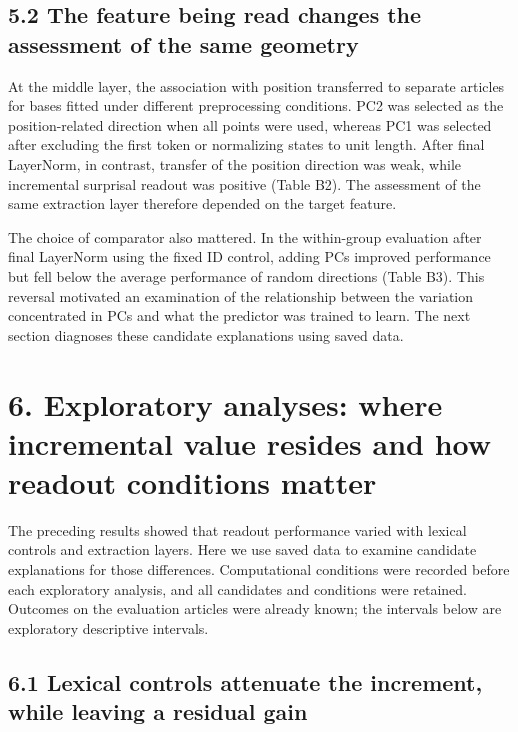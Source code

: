 \FloatBarrier

\subsection{5.2 The feature being read changes the assessment of the same geometry}\label{the-feature-being-read-changes-the-assessment-of-the-same-geometry}

At the middle layer, the association with position transferred to separate articles for bases fitted under different preprocessing conditions. PC2 was selected as the position-related direction when all points were used, whereas PC1 was selected after excluding the first token or normalizing states to unit length. After final LayerNorm, in contrast, transfer of the position direction was weak, while incremental surprisal readout was positive (Table B2). The assessment of the same extraction layer therefore depended on the target feature.

The choice of comparator also mattered. In the within-group evaluation after final LayerNorm using the fixed ID control, adding PCs improved performance but fell below the average performance of random directions (Table B3). This reversal motivated an examination of the relationship between the variation concentrated in PCs and what the predictor was trained to learn. The next section diagnoses these candidate explanations using saved data.

\FloatBarrier

\section{6. Exploratory analyses: where incremental value resides and how readout conditions matter}\label{exploratory-analyses-where-incremental-value-resides-and-how-readout-conditions-matter}

The preceding results showed that readout performance varied with lexical controls and extraction layers. Here we use saved data to examine candidate explanations for those differences. Computational conditions were recorded before each exploratory analysis, and all candidates and conditions were retained. Outcomes on the evaluation articles were already known; the intervals below are exploratory descriptive intervals.

\FloatBarrier

\subsection{6.1 Lexical controls attenuate the increment, while leaving a residual gain}\label{lexical-controls-attenuate-the-increment-while-leaving-a-residual-gain}

